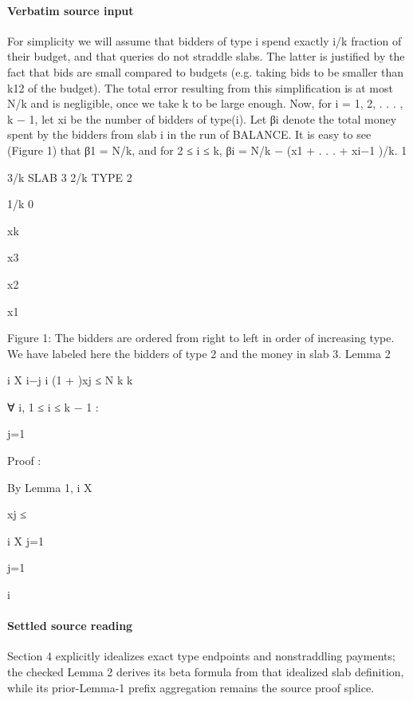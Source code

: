 \documentclass[10pt]{article}
\begin{document}
\paragraph{Verbatim source input}
\begin{ReviewVerbatim}
For simplicity we will assume that bidders of type i spend exactly i/k fraction of their budget,
and that queries do not straddle slabs. The latter is justified by the fact that bids are small
compared to budgets (e.g. taking bids to be smaller than k12 of the budget). The total error
resulting from this simplification is at most N/k and is negligible, once we take k to be large
enough. Now, for i = 1, 2, . . . , k − 1, let xi be the number of bidders of type(i). Let βi denote
the total money spent by the bidders from slab i in the run of BALANCE. It is easy to see
(Figure 1) that β1 = N/k, and for 2 ≤ i ≤ k, βi = N/k − (x1 + . . . + xi−1 )/k.
1

3/k
SLAB 3
2/k
TYPE 2

1/k
0

xk

x3

x2

x1

Figure 1: The bidders are ordered from right to left in order of increasing type. We have labeled here
the bidders of type 2 and the money in slab 3.
Lemma 2

i
X
i−j
i
(1 +
)xj ≤ N
k
k

∀ i, 1 ≤ i ≤ k − 1 :

j=1

Proof :

By Lemma 1,
i
X

xj ≤

i
X
j=1

j=1

i
\end{ReviewVerbatim}

\paragraph{Settled source reading}
\begin{sloppypar}
Section 4 explicitly idealizes exact type endpoints and nonstraddling payments;\allowbreak{} the checked Lemma 2 derives its beta formula from that idealized slab definition, while its prior-\allowbreak{}Lemma-\allowbreak{}1 prefix aggregation remains the source proof splice.\allowbreak{}
\end{sloppypar}
\end{document}
